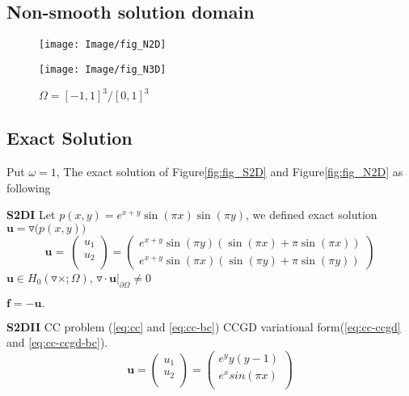\documentclass[a4paper,11pt]{article}
\begin{document}
\subsection{Non-smooth solution domain}

\begin{figure}[bhpt]
  \hspace{-5.pt}
  \begin{minipage}[b]{0.5 \textwidth}
    \centering
    \texttt{[image: Image/fig\_N2D]}\\
    \caption{$\Omega = [-1,1]^2/[0,1]\times[-1,0]$.}\label{fig:fig_N2D}
  \end{minipage}
  \hspace{-0.2in}
  \begin{minipage}[b]{0.5 \textwidth}
    \centering
    \texttt{[image: Image/fig\_N3D]}\\
    \caption{$\Omega = [-1,1]^3/[0,1]^3$}\label{fig:fig_N3D}
  \end{minipage}
\end{figure}
\newpage
\subsection{Exact Solution}
Put $\omega = 1$, The exact solution of Figure\ref{fig:fig_S2D} and Figure\ref{fig:fig_N2D} as following

\textbf{S2DI} Let $p(x,y) = e^{x + y}\sin(\pi x)\sin(\pi y)$, we defined exact solution $\mathbf{u} = \triangledown \big(p(x,y)\big)$
\begin{equation}
\mathbf{u} = \
\left( \begin{array}{c}
      u_1 \\
      u_2 \\
\end{array} \right) =
\left( \begin{array}{c}
      e^{x+y}\sin(\pi y)(\sin(\pi x) + \pi\sin(\pi x)) \\
      e^{x+y}\sin(\pi x)(\sin(\pi y) + \pi\sin(\pi y))
\end{array} \right)
\end{equation}
\indent\indent\indent\indent\indent\indent\indent\indent$\mathbf{u}\in H_0(\triangledown\times;\Omega)$, $\triangledown\cdot\mathbf{u}|_{\partial\Omega} \neq 0$

\indent\indent\indent\indent\indent\indent\indent\indent$\mathbf{f} = -\mathbf{u}.$

\textbf{S2DII} CC problem (\ref{eq:cc} and \ref{eq:cc-bc}) CCGD variational form(\ref{eq:cc-ccgd} and \ref{eq:cc-ccgd-bc}).
\begin{equation}
\mathbf{u} =
\left( \begin{array}{c}
      u_1 \\
      u_2 \\
\end{array} \right) =
\left( \begin{array}{c}
      e^{y}y(y-1) \\
      e^{x}sin(\pi x) \\
\end{array} \right)
\end{equation}
\end{document}
